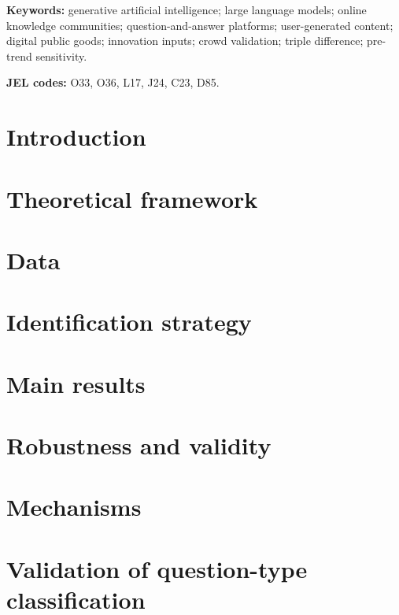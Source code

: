 \documentclass[12pt]{article}
\begin{document}
\noindent\textbf{Keywords:} generative artificial
intelligence; large language models; online knowledge
communities; question-and-answer platforms; user-generated
content; digital public goods; innovation inputs;
crowd validation; triple difference;
pre-trend sensitivity.

\noindent\textbf{JEL codes:} O33, O36, L17, J24, C23, D85.

\section{Introduction}\label{sec:intro}


\section{Theoretical framework}\label{sec:theory}


\section{Data}\label{sec:data}


\section{Identification strategy}\label{sec:identification}


\section{Main results}\label{sec:results}


\section{Robustness and validity}\label{sec:robustness}


\section{Mechanisms}\label{sec:mechanisms}


\section{Validation of question-type classification}\label{sec:validation}

\end{document}
